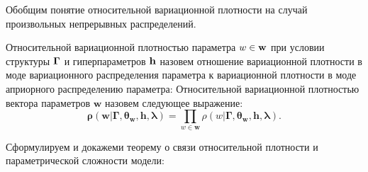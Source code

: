 Обобщим понятие относительной вариационной плотности на случай произвольных непрерывных распределений.
\begin{defin}
Относительной вариационной   плотностью параметра $w \in \mathbf{w}$  при условии структуры $\boldsymbol{\Gamma}$ и гиперпараметров $\mathbf{h}$ назовем отношение вариационной плотности в моде вариационного распределения параметра к вариационной плотности в моде априорного распределению параметра:
Относительной вариационной плотностью вектора параметров $\mathbf{w}$ назовем следующее выражение:
\[
    \boldsymbol{\rho}(\mathbf{w}|\boldsymbol{\Gamma}, \boldsymbol{\theta}_\mathbf{w}, \mathbf{h},\boldsymbol{\lambda}) = \prod_{w \in \mathbf{w}}\rho(w|\boldsymbol{\Gamma}, \boldsymbol{\theta}_\mathbf{w}, \mathbf{h},\boldsymbol{\lambda}).
\]

\end{defin}

Сформулируем и докажеми теорему о связи относительной плотности и параметрической сложности модели:

